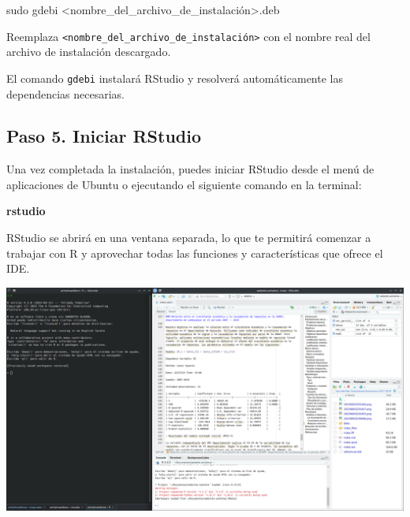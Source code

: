 \documentclass[
  a4paper,
]{article}
\newenvironment{Shaded}{}{}
\newcommand{\ExtensionTok}[1]{\textcolor[rgb]{0.84,0.23,0.29}{\textbf{#1}}}
\newcommand{\FunctionTok}[1]{\textcolor[rgb]{0.44,0.26,0.76}{#1}}
\newcommand{\NormalTok}[1]{\textcolor[rgb]{0.14,0.16,0.18}{#1}}
\newcommand{\OperatorTok}[1]{\textcolor[rgb]{0.14,0.16,0.18}{#1}}
\begin{document}
\begin{Shaded}
\begin{Highlighting}[]
\FunctionTok{sudo}\NormalTok{ gdebi }\OperatorTok{\textless{}}\NormalTok{nombre\_del\_archivo\_de\_instalación}\OperatorTok{\textgreater{}}\NormalTok{.deb}
\end{Highlighting}
\end{Shaded}

Reemplaza
\texttt{\textless{}nombre\_del\_archivo\_de\_instalación\textgreater{}}
con el nombre real del archivo de instalación descargado.

El comando \texttt{gdebi} instalará RStudio y resolverá automáticamente
las dependencias necesarias.

\hypertarget{paso-5.-iniciar-rstudio}{%
\subsection{Paso 5. Iniciar RStudio}\label{paso-5.-iniciar-rstudio}}

Una vez completada la instalación, puedes iniciar RStudio desde el menú
de aplicaciones de Ubuntu o ejecutando el siguiente comando en la
terminal:

\begin{Shaded}
\begin{Highlighting}[]
\ExtensionTok{rstudio}
\end{Highlighting}
\end{Shaded}

RStudio se abrirá en una ventana separada, lo que te permitirá comenzar
a trabajar con R y aprovechar todas las funciones y características que
ofrece el IDE.

\includegraphics{images/Screenshot_20230610_231407.png}


\printbibliography
\end{document}
